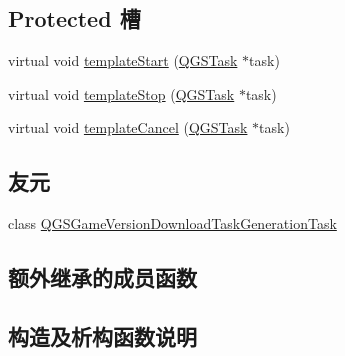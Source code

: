 \subsection*{Protected 槽}
\begin{DoxyCompactItemize}
\item 
virtual void \mbox{\hyperlink{class_q_g_s_game_version_json_download_task_generation_task_a045ff42dc6c6be972761fa170b0399dc}{template\+Start}} (\mbox{\hyperlink{class_q_g_s_task}{Q\+G\+S\+Task}} $\ast$task)
\item 
virtual void \mbox{\hyperlink{class_q_g_s_game_version_json_download_task_generation_task_a7d1417dab0644bf64c6d984a43209dc1}{template\+Stop}} (\mbox{\hyperlink{class_q_g_s_task}{Q\+G\+S\+Task}} $\ast$task)
\item 
virtual void \mbox{\hyperlink{class_q_g_s_game_version_json_download_task_generation_task_ace491061384680c558c0c3e29d8a5306}{template\+Cancel}} (\mbox{\hyperlink{class_q_g_s_task}{Q\+G\+S\+Task}} $\ast$task)
\end{DoxyCompactItemize}
\subsection*{友元}
\begin{DoxyCompactItemize}
\item 
class \mbox{\hyperlink{class_q_g_s_game_version_json_download_task_generation_task_ac1ad33ecea9de4412662c804c9225001}{Q\+G\+S\+Game\+Version\+Download\+Task\+Generation\+Task}}
\end{DoxyCompactItemize}
\subsection*{额外继承的成员函数}


\subsection{构造及析构函数说明}
\mbox{\label{class_q_g_s_game_version_json_download_task_generation_task_a18ed71519edec443345992eca9d35255}} 
